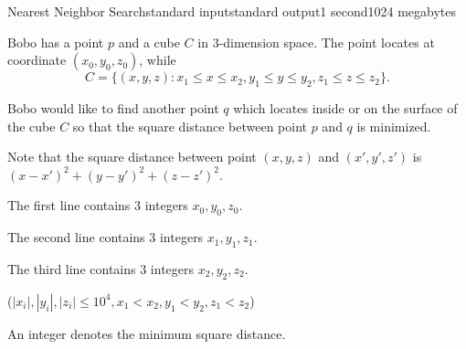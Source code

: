 \begin{problem}{Nearest Neighbor Search}{standard input}{standard output}{1 second}{1024 megabytes}

Bobo has a point $p$ and a cube $C$ in $3$-dimension space.
The point locates at coordinate $(x_0, y_0, z_0)$, 
while $$C = \{(x, y, z) : x_1 \leq x \leq x_2, y_1 \leq y \leq y_2, z_1 \leq z \leq z_2\}.$$

Bobo would like to find another point $q$ which locates inside or on the surface of the cube $C$ so that the square distance between point $p$ and $q$ is minimized.

Note that the square distance between point $(x, y, z)$ and $(x', y', z')$ is $(x - x')^2 + (y - y')^2 + (z - z')^2$.

\InputFile
The first line contains $3$ integers $x_0, y_0, z_0$.

The second line contains $3$ integers $x_1, y_1, z_1$.

The third line contains $3$ integers $x_2, y_2, z_2$.

($|x_i|, |y_i|, |z_i| \leq 10^4, x_1 < x_2, y_1 < y_2, z_1 < z_2$)

\OutputFile
An integer denotes the minimum square distance.

\Examples

\begin{example}
%
%
\end{example}

\end{problem}

